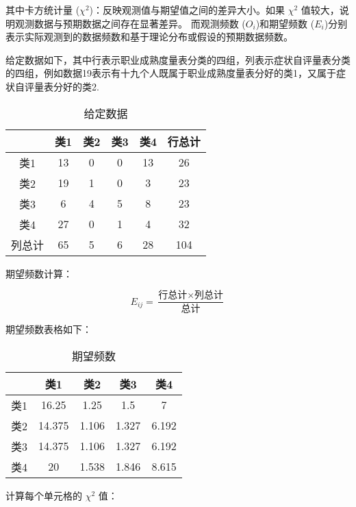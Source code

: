 \documentclass[withoutpreface,bwprint]{cumcmthesis} %
\begin{document}
其中卡方统计量 (\(\chi^2\))：反映观测值与期望值之间的差异大小。如果 \(\chi^2\) 值较大，说明观测数据与预期数据之间存在显著差异。
而观测频数 (\(O_i\))和期望频数 (\(E_i\))分别表示实际观测到的数据频数和基于理论分布或假设的预期数据频数。

给定数据如下，其中行表示职业成熟度量表分类的四组，列表示症状自评量表分类的四组，例如数据19表示有十九个人既属于职业成熟度量表分好的类1，又属于症状自评量表分好的类2.

\begin{table}[htbp]
    \centering
    \begin{tabular}{|c|c|c|c|c|c|}
        \hline
        & 类1 & 类2 & 类3 & 类4 & 行总计 \\
        \hline
        类1 & 13 & 0 & 0 & 13 & 26 \\
        \hline
        类2 & 19 & 1 & 0 & 3 & 23 \\
        \hline
        类3 & 6 & 4 & 5 & 8 & 23 \\
        \hline
        类4 & 27 & 0 & 1 & 4 & 32 \\
        \hline
        列总计 & 65 & 5 & 6 & 28 & 104 \\
        \hline
    \end{tabular}
    \caption{给定数据}
    \label{tab:data}
\end{table}

期望频数计算：

\begin{equation}
    E_{ij} = \frac{\text{行总计} \times \text{列总计}}{\text{总计}}
    \label{eq:expected_frep}
\end{equation}

期望频数表格如下：

\begin{table}[htbp]
    \centering
    \begin{tabular}{|c|c|c|c|c|}
        \hline
        & 类1 & 类2 & 类3 & 类4 \\
        \hline
        类1 & 16.25 & 1.25 & 1.5 & 7 \\
        \hline
        类2 & 14.375 & 1.106 & 1.327 & 6.192 \\
        \hline
        类3 & 14.375 & 1.106 & 1.327 & 6.192 \\
        \hline
        类4 & 20 & 1.538 & 1.846 & 8.615 \\
        \hline
    \end{tabular}
    \caption{期望频数}
    \label{tab:expected}
\end{table}
计算每个单元格的 \(\chi^2\) 值：
\end{document}

